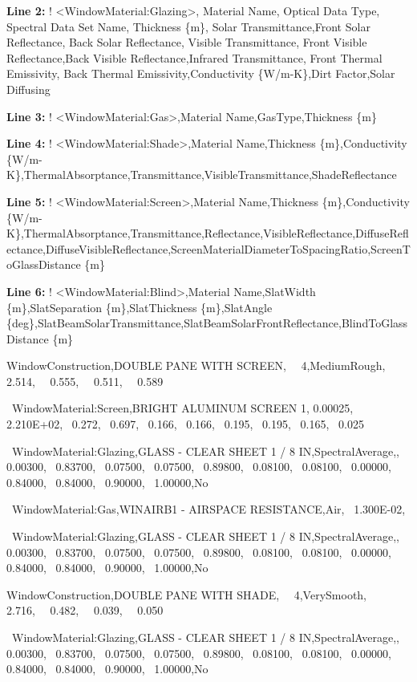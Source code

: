 \textbf{Line 2:} ! \textless{}WindowMaterial:Glazing\textgreater{}, Material Name, Optical Data Type, Spectral Data Set Name, Thickness \{m\}, Solar Transmittance,Front Solar Reflectance, Back Solar Reflectance, Visible Transmittance, Front Visible Reflectance,Back Visible Reflectance,Infrared Transmittance, Front Thermal Emissivity, Back Thermal Emissivity,Conductivity \{W/m-K\},Dirt Factor,Solar Diffusing

\textbf{Line 3:} ! \textless{}WindowMaterial:Gas\textgreater{},Material Name,GasType,Thickness \{m\}

\textbf{Line 4:} ! \textless{}WindowMaterial:Shade\textgreater{},Material Name,Thickness \{m\},Conductivity \{W/m-K\},ThermalAbsorptance,Transmittance,VisibleTransmittance,ShadeReflectance

\textbf{Line 5:} ! \textless{}WindowMaterial:Screen\textgreater{},Material Name,Thickness \{m\},Conductivity \{W/m-K\},ThermalAbsorptance,Transmittance,Reflectance,VisibleReflectance,DiffuseReflectance,DiffuseVisibleReflectance,ScreenMaterialDiameterToSpacingRatio,ScreenToGlassDistance \{m\}

\textbf{Line 6:} ! \textless{}WindowMaterial:Blind\textgreater{},Material Name,SlatWidth \{m\},SlatSeparation \{m\},SlatThickness \{m\},SlatAngle \{deg\},SlatBeamSolarTransmittance,SlatBeamSolarFrontReflectance,BlindToGlassDistance \{m\}

WindowConstruction,DOUBLE PANE WITH SCREEN,~~ 4,MediumRough,~~ 2.514,~~ 0.555,~~ 0.511,~~ 0.589

~WindowMaterial:Screen,BRIGHT ALUMINUM SCREEN 1, 0.00025,~ 2.210E+02,~ 0.272,~ 0.697,~ 0.166,~ 0.166,~ 0.195,~ 0.195,~ 0.165,~ 0.025

~WindowMaterial:Glazing,GLASS - CLEAR SHEET 1 / 8 IN,SpectralAverage,,~ 0.00300,~ 0.83700,~ 0.07500,~ 0.07500,~ 0.89800,~ 0.08100,~ 0.08100,~ 0.00000,~ 0.84000,~ 0.84000,~ 0.90000,~ 1.00000,No

~WindowMaterial:Gas,WINAIRB1 - AIRSPACE RESISTANCE,Air,~ 1.300E-02,

~WindowMaterial:Glazing,GLASS - CLEAR SHEET 1 / 8 IN,SpectralAverage,,~ 0.00300,~ 0.83700,~ 0.07500,~ 0.07500,~ 0.89800,~ 0.08100,~ 0.08100,~ 0.00000,~ 0.84000,~ 0.84000,~ 0.90000,~ 1.00000,No

WindowConstruction,DOUBLE PANE WITH SHADE,~~ 4,VerySmooth,~~ 2.716,~~ 0.482,~~ 0.039,~~ 0.050

~WindowMaterial:Glazing,GLASS - CLEAR SHEET 1 / 8 IN,SpectralAverage,,~ 0.00300,~ 0.83700,~ 0.07500,~ 0.07500,~ 0.89800,~ 0.08100,~ 0.08100,~ 0.00000,~ 0.84000,~ 0.84000,~ 0.90000,~ 1.00000,No

